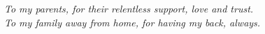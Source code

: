 \newpage \vspace*{8cm}
\thispagestyle{empty}

\begin{flushright}
   \emph{To my parents,  for their relentless support,  love and trust.\\
   To my family away from home,  for having my back, always.}
\end{flushright}
